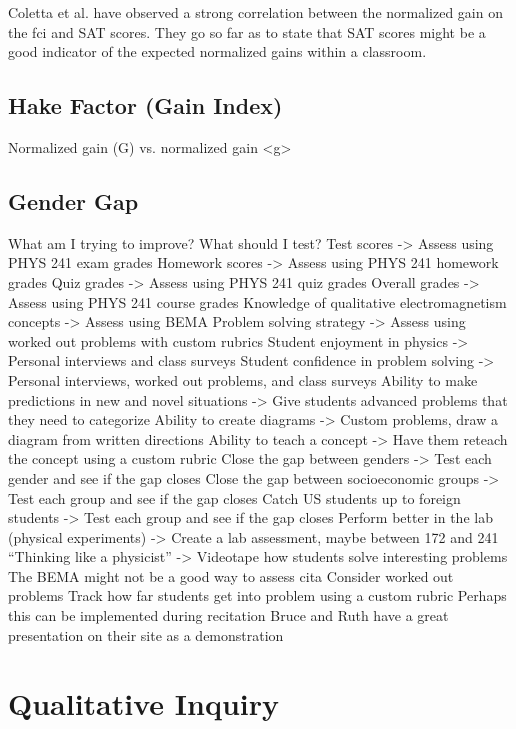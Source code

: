 Coletta et al. have observed a strong correlation between the normalized gain on the \gls{fci} and SAT scores. They go so far as to state that SAT scores might be a good indicator of the expected normalized gains within a classroom\cite{coletta2007}.

\subsection{Hake Factor (Gain Index)}

Normalized gain (G) vs. normalized gain <g>

\subsection{Gender Gap}

What am I trying to improve? What should I test?
Test scores -> Assess using PHYS 241 exam grades
Homework scores -> Assess using PHYS 241 homework grades
Quiz grades -> Assess using PHYS 241 quiz grades
Overall grades -> Assess using PHYS 241 course grades
Knowledge of qualitative electromagnetism concepts -> Assess using BEMA
Problem solving strategy -> Assess using worked out problems with custom rubrics
Student enjoyment in physics -> Personal interviews and class surveys
Student confidence in problem solving -> Personal interviews, worked out problems, and class surveys
Ability to make predictions in new and novel situations -> Give students advanced problems that they need to categorize
Ability to create diagrams -> Custom problems, draw a diagram from written directions
Ability to teach a concept -> Have them reteach the concept using a custom rubric
Close the gap between genders -> Test each gender and see if the gap closes
Close the gap between socioeconomic groups -> Test each group and see if the gap closes
Catch US students up to foreign students -> Test each group and see if the gap closes
Perform better in the lab (physical experiments) -> Create a lab assessment, maybe between 172 and 241
“Thinking like a physicist” -> Videotape how students solve interesting problems
The BEMA might not be a good way to assess \gls{cita}
Consider worked out problems
Track how far students get into problem using a custom rubric
Perhaps this can be implemented during recitation
Bruce and Ruth have a great presentation on their site as a demonstration






\section{Qualitative Inquiry}

